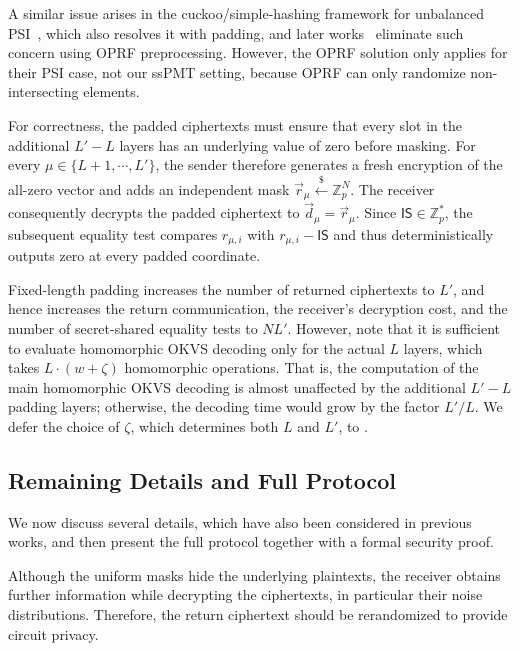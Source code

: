 \begin{remark} 
    A similar issue arises in the cuckoo/simple-hashing framework for unbalanced PSI~\cite{CLR17}, which also resolves it with padding, and later works~\cite{CHLR18,CMdG+21} eliminate such concern using OPRF preprocessing. However, the OPRF solution only applies for their PSI case, not our ssPMT setting, because OPRF can only randomize non-intersecting elements. 
\end{remark}

For correctness, the padded ciphertexts must ensure that every slot in the additional $L'-L$ layers has an underlying value of zero before masking.
For every $\mu\in\{L+1,\cdots,L'\}$, the sender therefore generates a fresh encryption of the all-zero vector and adds an independent mask $\vec r_\mu\xleftarrow{\$}\mathbb Z_p^N$.
The receiver consequently decrypts the padded ciphertext to $\vec d_\mu=\vec r_\mu$. Since $\mathsf{IS}\in\mathbb Z_p^\ast$, the subsequent equality test compares $r_{\mu,i}$ with $r_{\mu,i}-\mathsf{IS}$ and thus deterministically outputs zero at every padded coordinate.

Fixed-length padding increases the number of returned ciphertexts to $L'$, and hence increases the return communication, the receiver's decryption cost, and the number of secret-shared equality tests to $NL'$. However, note that it is sufficient to evaluate homomorphic OKVS decoding only for the actual $L$ layers, which takes $L\cdot (w+\zeta)$ homomorphic operations. That is, the computation of the main homomorphic OKVS decoding is almost unaffected by the additional $L'-L$ padding layers; otherwise, the decoding time would grow by the factor $L'/L$. We defer the choice of $\zeta$, which determines both $L$ and $L'$, to .





\subsection{Remaining Details and Full Protocol}\label{subsec:oursspmtProtocol}

We now discuss several details, which have also been considered in previous works, and then present the full protocol together with a formal security proof.

Although the uniform masks hide the underlying plaintexts, the receiver obtains further information while decrypting the ciphertexts, in particular their noise distributions. Therefore, the return ciphertext should be rerandomized to provide circuit privacy.

